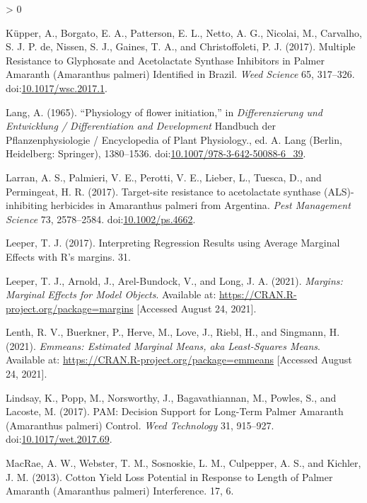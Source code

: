 \documentclass[utf8]{frontiersSCNS}
\newlength{\cslhangindent}
\newenvironment{CSLReferences}[2] %
 {%
  \setlength{\parindent}{0pt}
  \ifodd #1 \everypar{\setlength{\hangindent}{\cslhangindent}}\ignorespaces\fi
  \ifnum #2 > 0
  \setlength{\parskip}{#2\baselineskip}
  \fi
 }%
 {}
\begin{document}
\begin{CSLReferences}{1}{0}
\leavevmode\hypertarget{ref-kupper2017}{}%
Küpper, A., Borgato, E. A., Patterson, E. L., Netto, A. G., Nicolai, M.,
Carvalho, S. J. P. de, Nissen, S. J., Gaines, T. A., and Christoffoleti,
P. J. (2017). Multiple {Resistance} to {Glyphosate} and {Acetolactate
Synthase Inhibitors} in {Palmer Amaranth} ({Amaranthus} palmeri)
{Identified} in {Brazil}. \emph{Weed Science} 65, 317--326.
doi:\href{https://doi.org/10.1017/wsc.2017.1}{10.1017/wsc.2017.1}.

\leavevmode\hypertarget{ref-lang1965}{}%
Lang, A. (1965). {``Physiology of flower initiation,''} in
\emph{Differenzierung und {Entwicklung} / {Differentiation} and
{Development}} Handbuch der {Pflanzenphysiologie} / {Encyclopedia} of
{Plant Physiology}., ed. A. Lang ({Berlin, Heidelberg}: {Springer}),
1380--1536.
doi:\href{https://doi.org/10.1007/978-3-642-50088-6_39}{10.1007/978-3-642-50088-6\_39}.

\leavevmode\hypertarget{ref-larran2017}{}%
Larran, A. S., Palmieri, V. E., Perotti, V. E., Lieber, L., Tuesca, D.,
and Permingeat, H. R. (2017). Target-site resistance to acetolactate
synthase ({ALS})-inhibiting herbicides in {Amaranthus} palmeri from
{Argentina}. \emph{Pest Management Science} 73, 2578--2584.
doi:\href{https://doi.org/10.1002/ps.4662}{10.1002/ps.4662}.

\leavevmode\hypertarget{ref-leeper2017}{}%
Leeper, T. J. (2017). Interpreting {Regression Results} using {Average
Marginal Eﬀects} with {R}'s margins. 31.

\leavevmode\hypertarget{ref-leeper2021}{}%
Leeper, T. J., Arnold, J., Arel-Bundock, V., and Long, J. A. (2021).
\emph{Margins: {Marginal Effects} for {Model Objects}}. Available at:
\url{https://CRAN.R-project.org/package=margins} {[}Accessed August 24,
2021{]}.

\leavevmode\hypertarget{ref-lenth2021}{}%
Lenth, R. V., Buerkner, P., Herve, M., Love, J., Riebl, H., and
Singmann, H. (2021). \emph{Emmeans: {Estimated Marginal Means}, aka
{Least}-{Squares Means}}. Available at:
\url{https://CRAN.R-project.org/package=emmeans} {[}Accessed August 24,
2021{]}.

\leavevmode\hypertarget{ref-lindsay2017}{}%
Lindsay, K., Popp, M., Norsworthy, J., Bagavathiannan, M., Powles, S.,
and Lacoste, M. (2017). {PAM}: {Decision Support} for {Long}-{Term
Palmer Amaranth} ({Amaranthus} palmeri) {Control}. \emph{Weed
Technology} 31, 915--927.
doi:\href{https://doi.org/10.1017/wet.2017.69}{10.1017/wet.2017.69}.

\leavevmode\hypertarget{ref-macrae2013}{}%
MacRae, A. W., Webster, T. M., Sosnoskie, L. M., Culpepper, A. S., and
Kichler, J. M. (2013). Cotton {Yield Loss Potential} in {Response} to
{Length} of {Palmer Amaranth} ({Amaranthus} palmeri) {Interference}. 17,
6.


\end{CSLReferences}
\end{document}
